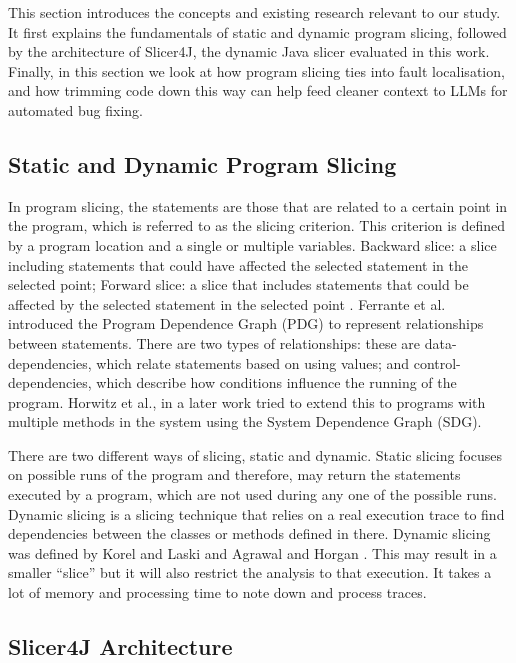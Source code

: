 \documentclass[sigconf,nonacm]{acmart}
\begin{document}
This section introduces the concepts and existing research relevant to our study. It first explains the fundamentals of static and dynamic program slicing, followed by the architecture of Slicer4J, the dynamic Java slicer evaluated in this work. Finally, in this section we look at how program slicing ties into fault localisation, and how trimming code down this way can help feed cleaner context to LLMs for automated bug fixing.

\subsection{Static and Dynamic Program Slicing}

In program slicing, the statements are those that are related to a certain point in the program, which is referred to as the slicing criterion. This criterion is defined by a program location and a single or multiple variables. Backward slice: a slice including statements that could have affected the selected statement in the selected point; Forward slice: a slice that includes statements that could be affected by the selected statement in the selected point \cite{Weiser1981ProgramSlicing, Weiser1984ProgramSlicing}. Ferrante et al. \cite{Ferrante1987PDG} introduced the Program Dependence Graph (PDG) to represent relationships between statements. There are two types of relationships: these are data-dependencies, which relate statements based on using values; and control-dependencies, which describe how conditions influence the running of the program. Horwitz et al., in a later work \cite{Horwitz1990SDG} tried to extend this to programs with multiple methods in the system using the System Dependence Graph (SDG).

There are two different ways of slicing, static and dynamic. Static slicing focuses on possible runs of the program and therefore, may return the statements executed by a program, which are not used during any one of the possible runs. Dynamic slicing is a slicing technique that relies on a real execution trace to find dependencies between the classes or methods defined in there. Dynamic slicing was defined by Korel and Laski \cite{Korel1988Dynamic} and Agrawal and Horgan \cite{Agrawal1990Dynamic}. This may result in a smaller ``slice'' but it will also restrict the analysis to that execution. It takes a lot of memory and processing time to note down and process traces.

\subsection{Slicer4J Architecture}
\end{document}
